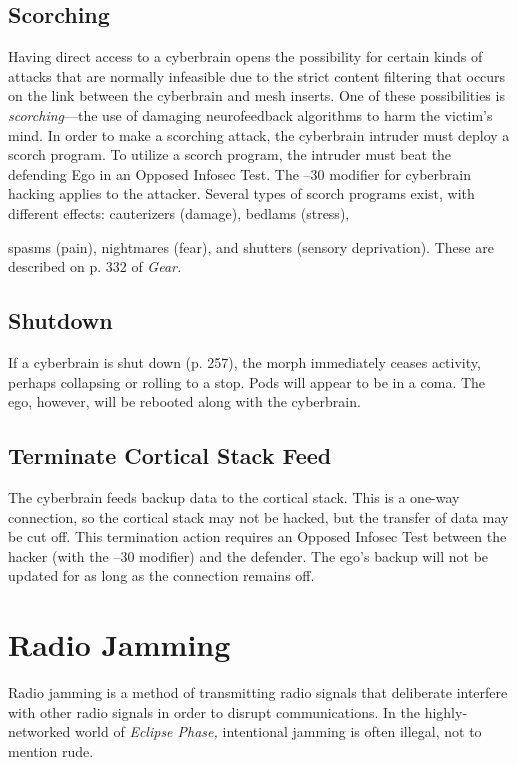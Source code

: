 \subsection{Scorching} 

Having direct access to a cyberbrain opens the possibility for certain kinds of attacks that are normally infeasible due to the strict content filtering that occurs on the link between the cyberbrain and mesh inserts. One of these possibilities is \textit{scorching}—the use of damaging neurofeedback algorithms to harm the victim's mind. In order to make a scorching attack, the cyberbrain intruder must deploy a scorch program. To utilize a scorch program, the intruder must beat the defending Ego in an Opposed Infosec Test. The –30 modifier for cyberbrain hacking applies to the attacker. Several types of scorch programs exist, with different effects: cauterizers (damage), bedlams (stress), 

spasms (pain), nightmares (fear), and shutters (sensory deprivation). These are described on p. 332 of \textit{Gear.} 

\subsection{Shutdown} 

If a cyberbrain is shut down (p. 257), the morph immediately ceases activity, perhaps collapsing or rolling to a stop. Pods will appear to be in a coma. The ego, however, will be rebooted along with the cyberbrain. 

\subsection{Terminate Cortical Stack Feed} 

The cyberbrain feeds backup data to the cortical stack. This is a one-way connection, so the cortical stack may not be hacked, but the transfer of data may be cut off. This termination action requires an Opposed Infosec Test between the hacker (with the –30 modifier) and the defender. The ego's backup will not be updated for as long as the connection remains off. 

\section{Radio Jamming} 

Radio jamming is a method of transmitting radio signals that deliberate interfere with other radio signals in order to disrupt communications. In the highly-networked world of \textit{Eclipse Phase,} intentional jamming is often illegal, not to mention rude. 

